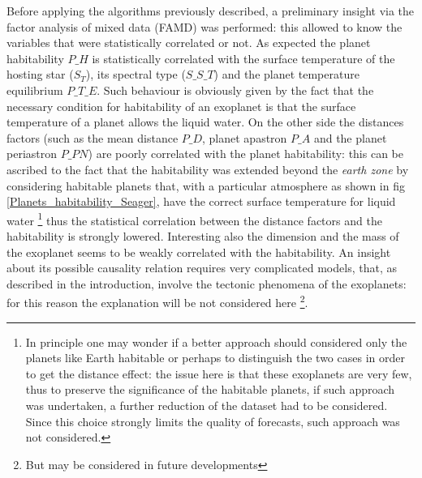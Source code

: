\documentclass[
12pt, %
a4paper, %
oneside, %
headinclude,footinclude, %
BCOR5mm, %
]{scrartcl}
\begin{document}
Before applying the algorithms previously described, a preliminary insight via the factor analysis of mixed data (FAMD) was performed: this allowed to know the variables that were statistically correlated or not. As expected the planet habitability $P\_H$ is statistically correlated with the surface temperature of the hosting star ($S_T$), its spectral type ($S\_S\_T$) and the planet temperature equilibrium $P\_T\_E$. Such behaviour is obviously given by the fact that the necessary condition for habitability of an exoplanet is that the surface temperature of a planet allows the liquid water. On the other side the distances factors (such as the mean distance $P\_D$, planet apastron $P\_A$ and the planet periastron $P\_PN$) are poorly correlated with the planet habitability: this can be ascribed to the fact that the habitability was extended beyond the \textit{earth zone} by considering habitable planets that, with a particular atmosphere as shown in fig \ref{Planets_habitability_Seager}, have the correct surface temperature for liquid water
\footnote{In principle one may wonder if a better approach should considered only the planets like Earth habitable or perhaps to distinguish the two cases in order to get the distance effect: the issue here is that these exoplanets are very few, thus to preserve the significance of the habitable planets, if such approach was undertaken, a further reduction of the dataset had to be considered. Since this choice strongly limits the quality of forecasts, such approach was not considered.} thus the statistical correlation between the distance factors and the habitability is strongly lowered. Interesting also the dimension and the mass of the exoplanet seems to be weakly correlated with the habitability. An insight about its possible causality relation requires very complicated models, that, as described in the introduction, involve the tectonic phenomena of the exoplanets: for this reason the explanation will be not considered here \footnote{But may be considered in future developments}.
\end{document}
